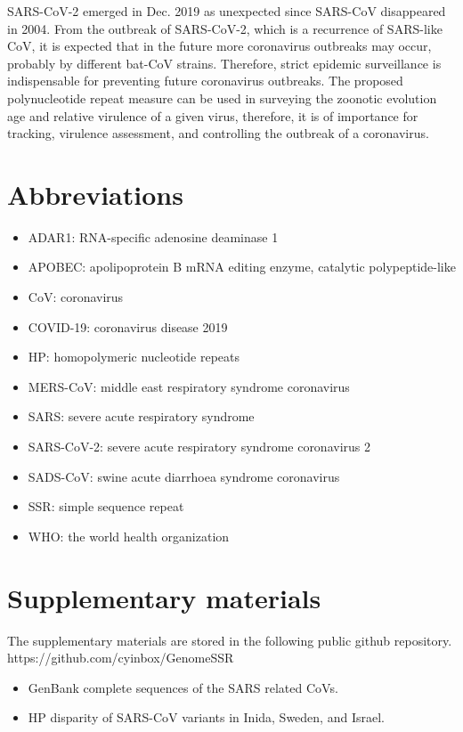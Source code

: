\documentclass{article}
\numberwithin{equation}{section}
\begin{document}
SARS-CoV-2 emerged in Dec. 2019 as unexpected since SARS-CoV disappeared in 2004. From the outbreak of SARS-CoV-2, which is a recurrence of SARS-like CoV, it is expected that in the future more coronavirus outbreaks may occur, probably by different bat-CoV strains. Therefore, strict epidemic surveillance is indispensable for preventing future coronavirus outbreaks. The proposed polynucleotide repeat measure can be used in surveying the zoonotic evolution age and relative virulence of a given virus, therefore, it is of importance for tracking, virulence assessment, and controlling the outbreak of a coronavirus.

\section*{Abbreviations}
\begin{itemize}
	\item ADAR1: RNA-specific adenosine deaminase 1
	\item APOBEC: apolipoprotein B mRNA editing enzyme, catalytic polypeptide-like
	\item CoV: coronavirus
	\item COVID-19: coronavirus disease 2019 
	\item HP: homopolymeric nucleotide repeats
	\item MERS-CoV: middle east respiratory syndrome coronavirus
	\item SARS: severe acute respiratory syndrome
	\item SARS-CoV-2: severe acute respiratory syndrome coronavirus 2
	\item SADS-CoV: swine acute diarrhoea syndrome coronavirus
	\item SSR: simple sequence repeat
	\item WHO: the world health organization
\end{itemize}

\section*{Supplementary materials}
The supplementary materials are stored in the following public github repository.
https://github.com/cyinbox/GenomeSSR \\
\begin{itemize}
	\item GenBank complete sequences of the SARS related CoVs.
	\item HP disparity of SARS-CoV variants in Inida, Sweden, and Israel.
\end{itemize}
\clearpage

%

\end{document}
